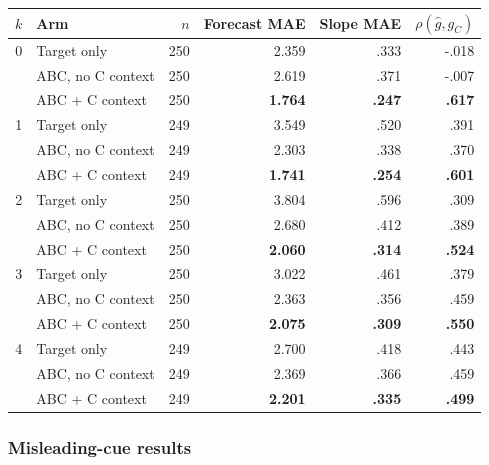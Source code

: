 \begin{center}
\begin{minipage}{\linewidth}
\centering
{}
\label{tab:coin-city-recovery-opus5}
\small
\begin{tabular}{c l r r r r}
\toprule
$k$ & Arm & $n$ & Forecast MAE & Slope MAE & $\rho(\hat g,g_C)$ \\
\midrule
0 & Target only & 250 & 2.359 & .333 & -.018 \\
  & ABC, no C context & 250 & 2.619 & .371 & -.007 \\
  & ABC + C context & 250 & \textbf{1.764} & \textbf{.247} & \textbf{.617} \\
\midrule
1 & Target only & 249 & 3.549 & .520 & .391 \\
  & ABC, no C context & 249 & 2.303 & .338 & .370 \\
  & ABC + C context & 249 & \textbf{1.741} & \textbf{.254} & \textbf{.601} \\
\midrule
2 & Target only & 250 & 3.804 & .596 & .309 \\
  & ABC, no C context & 250 & 2.680 & .412 & .389 \\
  & ABC + C context & 250 & \textbf{2.060} & \textbf{.314} & \textbf{.524} \\
\midrule
3 & Target only & 250 & 3.022 & .461 & .379 \\
  & ABC, no C context & 250 & 2.363 & .356 & .459 \\
  & ABC + C context & 250 & \textbf{2.075} & \textbf{.309} & \textbf{.550} \\
\midrule
4 & Target only & 249 & 2.700 & .418 & .443 \\
  & ABC, no C context & 249 & 2.369 & .366 & .459 \\
  & ABC + C context & 249 & \textbf{2.201} & \textbf{.335} & \textbf{.499} \\
\bottomrule
\end{tabular}
\end{minipage}
\end{center}




\subsubsection{Misleading-cue results}

